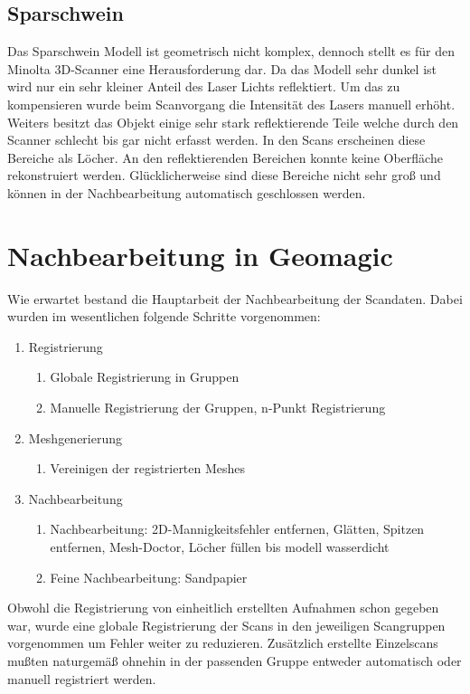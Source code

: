 \documentclass[]{article}
\begin{document}
\subsection{Sparschwein}
Das Sparschwein Modell ist geometrisch nicht komplex, dennoch stellt es für den Minolta 3D-Scanner eine Herausforderung dar. Da das Modell sehr dunkel ist wird  nur ein sehr kleiner Anteil des Laser Lichts reflektiert. Um das zu kompensieren wurde beim Scanvorgang die Intensität des Lasers manuell erhöht. Weiters besitzt das Objekt einige sehr stark reflektierende Teile welche durch den Scanner schlecht bis gar nicht erfasst werden. In den Scans erscheinen diese Bereiche als Löcher. An den reflektierenden Bereichen konnte keine Oberfläche rekonstruiert werden. Glücklicherweise sind diese Bereiche nicht sehr groß und können in der Nachbearbeitung automatisch geschlossen werden.

\section{Nachbearbeitung in Geomagic} %

Wie erwartet bestand die Hauptarbeit der Nachbearbeitung der Scandaten. Dabei wurden im wesentlichen folgende Schritte vorgenommen:

\begin{enumerate}
\item Registrierung
\begin{enumerate}
\item Globale Registrierung in Gruppen
\item Manuelle Registrierung der Gruppen, n-Punkt Registrierung
\end{enumerate}
\item Meshgenerierung
\begin{enumerate}
\item Vereinigen der registrierten Meshes
\end{enumerate}
\item Nachbearbeitung
\begin{enumerate}
\item Nachbearbeitung: 2D-Mannigkeitsfehler entfernen, Glätten, Spitzen entfernen, Mesh-Doctor, Löcher füllen
bis modell wasserdicht
\item Feine Nachbearbeitung: Sandpapier
\end{enumerate}
\end{enumerate}

Obwohl die Registrierung von einheitlich erstellten Aufnahmen schon gegeben war, wurde eine globale Registrierung der Scans in den jeweiligen Scangruppen vorgenommen um Fehler weiter zu reduzieren. Zusätzlich erstellte Einzelscans mußten naturgemäß ohnehin in der passenden Gruppe entweder automatisch oder manuell registriert werden.
\end{document}
